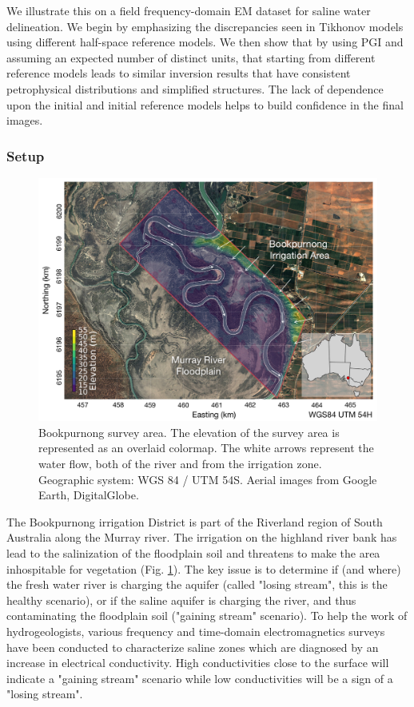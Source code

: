 \documentclass[extra]{gji} %
\begin{document}
We illustrate this on a field frequency-domain EM dataset \citep{WardandHohmann} for saline water delineation. We begin by emphasizing the discrepancies seen in Tikhonov models using different half-space reference models. We then show that by using PGI and assuming an expected number of distinct units, that starting from different reference models leads to similar inversion results that have consistent petrophysical distributions and simplified structures. The lack of dependence upon the initial and initial reference models helps to build confidence in the final images.

\subsubsection{Setup}

\begin{figure}
    \centering
    \includegraphics[width=\textwidth]{Fig/LowRes/Booky_setup.png}
    \caption[]{Bookpurnong survey area. The elevation of the survey area is represented as an overlaid colormap. The white arrows represent the water flow, both of the river and from the irrigation zone. Geographic system: WGS 84 / UTM 54S. Aerial images from Google Earth,  DigitalGlobe.}
    \label{fig:Book_Setup}
\end{figure}

The Bookpurnong irrigation District is part of the Riverland region of South Australia along the Murray river. The irrigation on the highland river bank has lead to the salinization of the floodplain soil and threatens to make the area inhospitable for vegetation (Fig. \ref{fig:Book_Setup}). The key issue is to determine if (and where) the fresh water river is charging the aquifer (called "losing stream", this is the healthy scenario), or if the saline aquifer is charging the river, and thus contaminating the floodplain soil ("gaining stream" scenario). To help the work of hydrogeologists, various frequency and time-domain electromagnetics surveys have been conducted to characterize saline zones which are diagnosed by an increase in electrical conductivity. High conductivities close to the surface will indicate a "gaining stream" scenario while low conductivities will be a sign of a "losing stream".
\end{document}
